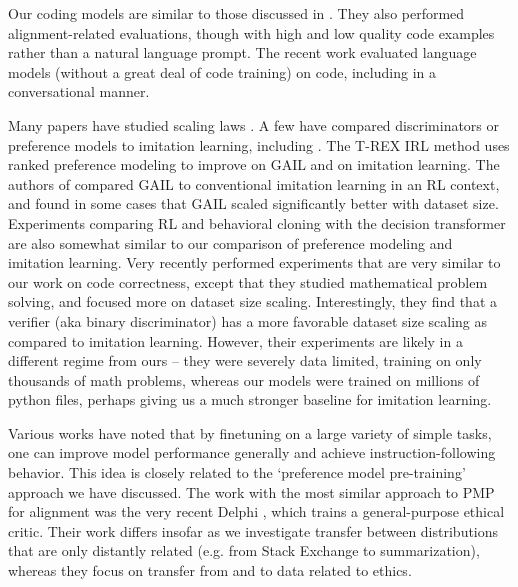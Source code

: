 Our coding models are similar to those discussed in \cite{chen2021evaluating}.  They also performed alignment-related evaluations, though with high and low quality code examples rather than a natural language prompt.  The recent work \cite{austin2021program} evaluated language models (without a great deal of code training) on code, including in a conversational manner.

Many papers have studied scaling laws \cite{1712.00409,1909.12673, kaplan2020scaling, jones2021scaling}.  A few have compared discriminators or preference models to imitation learning, including \cite{ibarz2018reward, stiennon2020learning, wu2021recursively}.  The T-REX IRL method \cite{brown2019extrapolating} uses ranked preference modeling to improve on GAIL and on imitation learning.   The authors of \cite{abramson2021imitating} compared GAIL \cite{ho2016generative} to conventional imitation learning in an RL context, and found in some cases that GAIL scaled significantly better with dataset size. Experiments comparing RL and behavioral cloning with the decision transformer \cite{chen2021decision} are also somewhat similar to our comparison of preference modeling and imitation learning. Very recently \cite{cobbe2021training} performed experiments that are very similar to our work on code correctness, except that they studied mathematical problem solving, and focused more on dataset size scaling.  Interestingly, they find that a verifier (aka binary discriminator) has a more favorable dataset size scaling as compared to imitation learning.  However, their experiments are likely in a  different regime from ours --  they were severely data limited, training on only thousands of math problems, whereas our models were trained on millions of python files, perhaps giving us a much stronger baseline for imitation learning.  

Various works \cite{lester2021power, wei2021finetuned, sanh2021multitask, aribandi2021ext5} have noted that by finetuning on a large variety of simple tasks, one can improve model performance generally and achieve instruction-following behavior.  This idea is closely related to the `preference model pre-training' approach we have discussed.  The work with the most similar approach to PMP for alignment was the very recent Delphi \cite{jiang2021delphi}, which trains a general-purpose ethical critic.  Their work differs insofar as we investigate transfer between distributions that are only distantly related (e.g. from Stack Exchange to summarization), whereas they focus on transfer from and to data  related to ethics.

